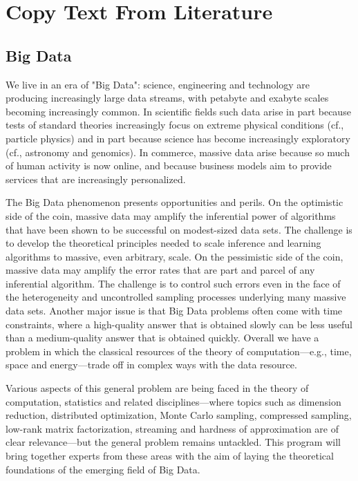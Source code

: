 ﻿\chapter{Copy Text From Literature}

\section{Big Data }
We live in an era of "Big Data": science, engineering and technology are producing increasingly large data streams, with petabyte and exabyte scales becoming increasingly common. In scientific fields such data arise in part because tests of standard theories increasingly focus on extreme physical conditions (cf., particle physics) and in part because science has become increasingly exploratory (cf., astronomy and genomics). In commerce, massive data arise because so much of human activity is now online, and because business models aim to provide services that are increasingly personalized.

The Big Data phenomenon presents opportunities and perils. On the optimistic side of the coin, massive data may amplify the inferential power of algorithms that have been shown to be successful on modest-sized data sets. The challenge is to develop the theoretical principles needed to scale inference and learning algorithms to massive, even arbitrary, scale. On the pessimistic side of the coin, massive data may amplify the error rates that are part and parcel of any inferential algorithm. The challenge is to control such errors even in the face of the heterogeneity and uncontrolled sampling processes underlying many massive data sets. Another major issue is that Big Data problems often come with time constraints, where a high-quality answer that is obtained slowly can be less useful than a medium-quality answer that is obtained quickly. Overall we have a problem in which the classical resources of the theory of computation—e.g., time, space and energy—trade off in complex ways with the data resource.

Various aspects of this general problem are being faced in the theory of computation, statistics and related disciplines—where topics such as dimension reduction, distributed optimization, Monte Carlo sampling, compressed sampling, low-rank matrix factorization, streaming and hardness of approximation are of clear relevance—but the general problem remains untackled. This program will bring together experts from these areas with the aim of laying the theoretical foundations of the emerging field of Big Data.

